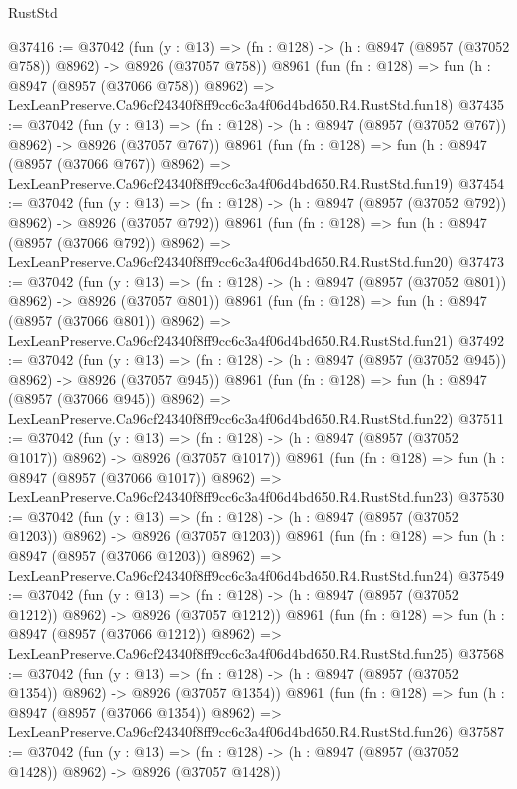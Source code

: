 \begin{lexlean}{RustStd}
\begin{coremodule}
@37416 := @37042
    (fun (y : @13) => (fn : @128) -> (h : @8947 (@8957 (@37052 @758)) @8962) -> @8926 (@37057 @758))
    @8961
    (fun (fn : @128) =>
    fun (h : @8947 (@8957 (@37066 @758)) @8962) =>
    LexLeanPreserve.Ca96cf24340f8ff9cc6c3a4f06d4bd650.R4.RustStd.fun18)
@37435 := @37042
    (fun (y : @13) => (fn : @128) -> (h : @8947 (@8957 (@37052 @767)) @8962) -> @8926 (@37057 @767))
    @8961
    (fun (fn : @128) =>
    fun (h : @8947 (@8957 (@37066 @767)) @8962) =>
    LexLeanPreserve.Ca96cf24340f8ff9cc6c3a4f06d4bd650.R4.RustStd.fun19)
@37454 := @37042
    (fun (y : @13) => (fn : @128) -> (h : @8947 (@8957 (@37052 @792)) @8962) -> @8926 (@37057 @792))
    @8961
    (fun (fn : @128) =>
    fun (h : @8947 (@8957 (@37066 @792)) @8962) =>
    LexLeanPreserve.Ca96cf24340f8ff9cc6c3a4f06d4bd650.R4.RustStd.fun20)
@37473 := @37042
    (fun (y : @13) => (fn : @128) -> (h : @8947 (@8957 (@37052 @801)) @8962) -> @8926 (@37057 @801))
    @8961
    (fun (fn : @128) =>
    fun (h : @8947 (@8957 (@37066 @801)) @8962) =>
    LexLeanPreserve.Ca96cf24340f8ff9cc6c3a4f06d4bd650.R4.RustStd.fun21)
@37492 := @37042
    (fun (y : @13) => (fn : @128) -> (h : @8947 (@8957 (@37052 @945)) @8962) -> @8926 (@37057 @945))
    @8961
    (fun (fn : @128) =>
    fun (h : @8947 (@8957 (@37066 @945)) @8962) =>
    LexLeanPreserve.Ca96cf24340f8ff9cc6c3a4f06d4bd650.R4.RustStd.fun22)
@37511 := @37042
    (fun (y : @13) =>
    (fn : @128) -> (h : @8947 (@8957 (@37052 @1017)) @8962) -> @8926 (@37057 @1017))
    @8961
    (fun (fn : @128) =>
    fun (h : @8947 (@8957 (@37066 @1017)) @8962) =>
    LexLeanPreserve.Ca96cf24340f8ff9cc6c3a4f06d4bd650.R4.RustStd.fun23)
@37530 := @37042
    (fun (y : @13) =>
    (fn : @128) -> (h : @8947 (@8957 (@37052 @1203)) @8962) -> @8926 (@37057 @1203))
    @8961
    (fun (fn : @128) =>
    fun (h : @8947 (@8957 (@37066 @1203)) @8962) =>
    LexLeanPreserve.Ca96cf24340f8ff9cc6c3a4f06d4bd650.R4.RustStd.fun24)
@37549 := @37042
    (fun (y : @13) =>
    (fn : @128) -> (h : @8947 (@8957 (@37052 @1212)) @8962) -> @8926 (@37057 @1212))
    @8961
    (fun (fn : @128) =>
    fun (h : @8947 (@8957 (@37066 @1212)) @8962) =>
    LexLeanPreserve.Ca96cf24340f8ff9cc6c3a4f06d4bd650.R4.RustStd.fun25)
@37568 := @37042
    (fun (y : @13) =>
    (fn : @128) -> (h : @8947 (@8957 (@37052 @1354)) @8962) -> @8926 (@37057 @1354))
    @8961
    (fun (fn : @128) =>
    fun (h : @8947 (@8957 (@37066 @1354)) @8962) =>
    LexLeanPreserve.Ca96cf24340f8ff9cc6c3a4f06d4bd650.R4.RustStd.fun26)
@37587 := @37042
    (fun (y : @13) =>
    (fn : @128) -> (h : @8947 (@8957 (@37052 @1428)) @8962) -> @8926 (@37057 @1428))

\end{coremodule}
\end{lexlean}
